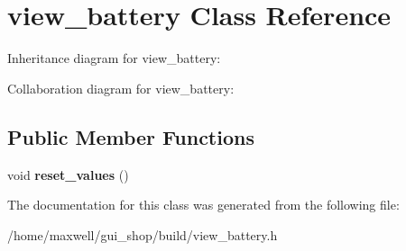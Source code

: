\hypertarget{classview__battery}{}\section{view\+\_\+battery Class Reference}
\label{classview__battery}


Inheritance diagram for view\+\_\+battery\+:


Collaboration diagram for view\+\_\+battery\+:
\subsection*{Public Member Functions}
\begin{DoxyCompactItemize}
\item 
void {\bfseries reset\+\_\+values} ()\hypertarget{classview__battery_a54504ed9dda6e3d14889a6b686fc2f24}{}\label{classview__battery_a54504ed9dda6e3d14889a6b686fc2f24}

\end{DoxyCompactItemize}


The documentation for this class was generated from the following file\+:\begin{DoxyCompactItemize}
\item 
/home/maxwell/gui\+\_\+shop/build/view\+\_\+battery.\+h\end{DoxyCompactItemize}
